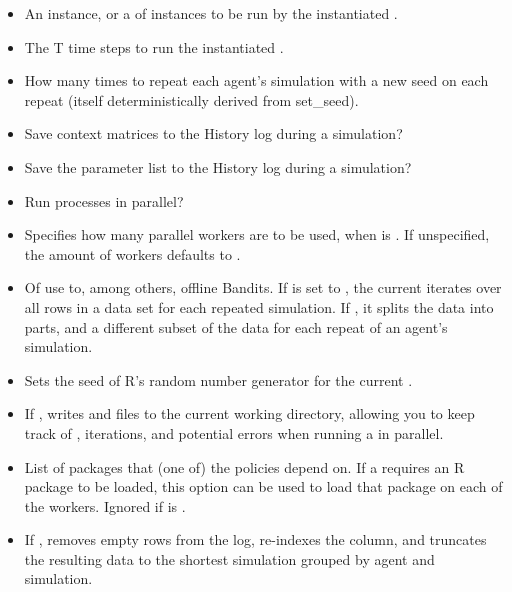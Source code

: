 \documentclass{jss}\usepackage[]{graphicx}\usepackage[]{color}
\begin{document}
\begin{itemize}
   \item{}{
     An  instance, or a  of  instances to be run by the instantiated .
   }
   \item{}{
     The T time steps to run the instantiated .
   }
   \item{}{
     How many times to repeat each agent's simulation with a new seed on each repeat (itself deterministically derived from set\_seed).
   }
   \item{}{
     Save context matrices  to the History log during a simulation?
   }
   \item{}{
     Save the parameter list  to the History log during a simulation?
   }
   \item{}{
      Run  processes in parallel?
   }
   \item{}{
      Specifies how many parallel workers are to be used, when  is . If unspecified, the amount of workers defaults to .
   }
   \item{}{
      Of use to, among others, offline Bandits.
      If  is set to , the current 
      iterates over all rows in a data set for each repeated simulation.
      If , it splits the data into  parts,
      and a different subset of the data for each repeat of an agent's simulation.
   }
   \item{}{
      Sets the seed of R's random number generator for the current .
   }
   \item{}{
       If ,  writes  and 
       files to the current working directory, allowing you to keep track of , iterations,
       and potential errors when running a  in parallel.
   }
   \item{}{
       List of packages that (one of) the policies depend on. If a  requires an
       R package to be loaded, this option can be used to load that package on each of the workers.
       Ignored if  is .
   }
   \item{}{
      If , removes empty rows from the  log,
      re-indexes the  column, and truncates the resulting data to the shortest simulation
      grouped by agent and simulation.
   }
\end{itemize}
\end{document}
